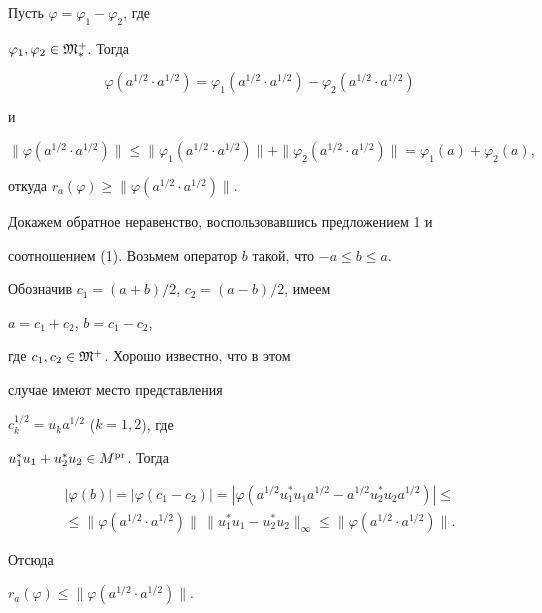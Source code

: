 \begin{pf}


Пусть $\varphi=\varphi_1 - \varphi_2$, где 


$ \varphi_1, \varphi_2 \in {\frak M}_*^+$. Тогда 


$$


\varphi (a^{1/2} \cdot a^{1/2})=


\varphi_1 (a^{1/2} \cdot a^{1/2}) - 


\varphi_2 (a^{1/2} \cdot a^{1/2}) 


$$


и 


$$ 


\| \varphi (a^{1/2} \cdot a^{1/2}) \| \le 


\| \varphi_1 (a^{1/2} \cdot a^{1/2}) \| + 


\| \varphi_2 (a^{1/2} \cdot a^{1/2}) \| =


\varphi_1 (a) + \varphi_2 (a),


$$


откуда $r_a (\varphi) \ge \| \varphi (a^{1/2} \cdot a^{1/2}) \|$. 


Докажем обратное неравенство, воспользовавшись предложением 1 и 


соотношением (1). Возьмем оператор $b$ такой, что $-a \le b \le a$. 


Обозначив $c_1=(a + b)/2$, $c_2=(a - b)/2$, имеем


$a=c_1 + c_2$, $b=c_1 - c_2$, 


где $c_1, c_2 \in \frak M^+$. Хорошо известно, что в этом 


случае имеют место представления 


$c_k^{1/2}=u_k a^{1/2}$ ($k=1,2$), где 


$u_1^* u_1 + u_2^* u_2 \in M^{\operatorname{pr}}$. Тогда 


\begin{multline*}


| \varphi (b)|=| \varphi (c_1 - c_2)| =


| \varphi (a^{1/2} u_1^* u_1 a^{1/2} -


a^{1/2} u_2^* u_2 a^{1/2})| \le \\


%


\le \| \varphi (a^{1/2} \cdot a^{1/2}) \|\,


\| u_1^* u_1 - u_2^* u_2 \|_{\infty} \le


\| \varphi (a^{1/2} \cdot a^{1/2}) \|.


\end{multline*}


Отсюда 


$r_a (\varphi) \le \| \varphi (a^{1/2} \cdot a^{1/2}) \| $.


\end{pf}





